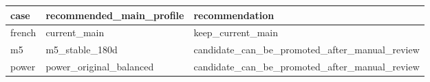 \begin{tabular}{lll}
\toprule
case & recommended\_main\_profile & recommendation \\
\midrule
french & current\_main & keep\_current\_main \\
m5 & m5\_stable\_180d & candidate\_can\_be\_promoted\_after\_manual\_review \\
power & power\_original\_balanced & candidate\_can\_be\_promoted\_after\_manual\_review \\
\bottomrule
\end{tabular}
